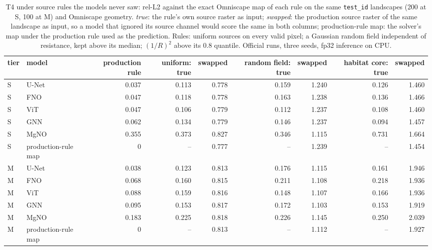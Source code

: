 \begin{table}[htbp]
\centering
\scriptsize
\setlength{\tabcolsep}{3.5pt}
\caption{T4 under source rules the models never saw: rel-L2 against the exact Omniscape map of each rule on the same \texttt{test\_id} landscapes (200 at S, 100 at M) and Omniscape geometry. \emph{true}: the rule's own source raster as input; \emph{swapped}: the production source raster of the same landscape as input, so a model that ignored its source channel would score the same in both columns; production-rule map: the solver's map under the production rule used as the prediction. Rules: uniform sources on every valid pixel; a Gaussian random field independent of resistance, kept above its median; $(1/R)^2$ above its 0.8 quantile. Official runs, three seeds, fp32 inference on CPU.}
\label{tab:source}
\setlength{\tabcolsep}{2.2pt}
\begin{tabular}{llrrrrrrr}
\toprule
tier & model & production rule & uniform: true & swapped & random field: true & swapped & habitat core: true & swapped \\
\midrule
S & U-Net & 0.037 & 0.113 & 0.778 & 0.159 & 1.240 & 0.126 & 1.460 \\
S & FNO & 0.047 & 0.118 & 0.778 & 0.163 & 1.238 & 0.136 & 1.466 \\
S & ViT & 0.047 & 0.106 & 0.779 & 0.112 & 1.237 & 0.108 & 1.460 \\
S & GNN & 0.062 & 0.134 & 0.779 & 0.146 & 1.237 & 0.094 & 1.457 \\
S & MgNO & 0.355 & 0.373 & 0.827 & 0.346 & 1.115 & 0.731 & 1.664 \\
S & production-rule map & 0 & -- & 0.777 & -- & 1.239 & -- & 1.454 \\
M & U-Net & 0.038 & 0.123 & 0.813 & 0.176 & 1.115 & 0.161 & 1.946 \\
M & FNO & 0.068 & 0.160 & 0.815 & 0.211 & 1.108 & 0.218 & 1.936 \\
M & ViT & 0.088 & 0.159 & 0.816 & 0.148 & 1.107 & 0.166 & 1.936 \\
M & GNN & 0.095 & 0.153 & 0.817 & 0.172 & 1.103 & 0.153 & 1.919 \\
M & MgNO & 0.183 & 0.225 & 0.818 & 0.226 & 1.145 & 0.250 & 2.039 \\
M & production-rule map & 0 & -- & 0.813 & -- & 1.112 & -- & 1.927 \\
\bottomrule
\end{tabular}
\end{table}
